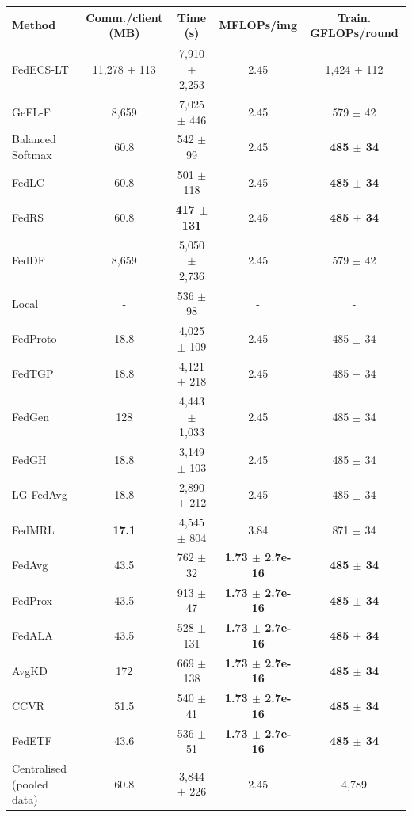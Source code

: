 \begin{tabular}{lcccc}
\toprule
Method & Comm./client (MB) & Time (s) & MFLOPs/img & Train. GFLOPs/round\\
\midrule
FedECS-LT & 11,278 $\pm$ 113 & 7,910 $\pm$ 2,253 & 2.45 & 1,424 $\pm$ 112\\
GeFL-F & 8,659 & 7,025 $\pm$ 446 & 2.45 & 579 $\pm$ 42\\
Balanced Softmax & 60.8 & 542 $\pm$ 99 & 2.45 & \textbf{485 $\pm$ 34}\\
FedLC & 60.8 & 501 $\pm$ 118 & 2.45 & \textbf{485 $\pm$ 34}\\
FedRS & 60.8 & \textbf{417 $\pm$ 131} & 2.45 & \textbf{485 $\pm$ 34}\\
FedDF & 8,659 & 5,050 $\pm$ 2,736 & 2.45 & 579 $\pm$ 42\\
Local & - & 536 $\pm$ 98 & - & -\\
FedProto & 18.8 & 4,025 $\pm$ 109 & 2.45 & 485 $\pm$ 34\\
FedTGP & 18.8 & 4,121 $\pm$ 218 & 2.45 & 485 $\pm$ 34\\
FedGen & 128 & 4,443 $\pm$ 1,033 & 2.45 & 485 $\pm$ 34\\
FedGH & 18.8 & 3,149 $\pm$ 103 & 2.45 & 485 $\pm$ 34\\
LG-FedAvg & 18.8 & 2,890 $\pm$ 212 & 2.45 & 485 $\pm$ 34\\
FedMRL & \textbf{17.1} & 4,545 $\pm$ 804 & 3.84 & 871 $\pm$ 34\\
FedAvg & 43.5 & 762 $\pm$ 32 & \textbf{1.73 $\pm$ 2.7e-16} & \textbf{485 $\pm$ 34}\\
FedProx & 43.5 & 913 $\pm$ 47 & \textbf{1.73 $\pm$ 2.7e-16} & \textbf{485 $\pm$ 34}\\
FedALA & 43.5 & 528 $\pm$ 131 & \textbf{1.73 $\pm$ 2.7e-16} & \textbf{485 $\pm$ 34}\\
AvgKD & 172 & 669 $\pm$ 138 & \textbf{1.73 $\pm$ 2.7e-16} & \textbf{485 $\pm$ 34}\\
CCVR & 51.5 & 540 $\pm$ 41 & \textbf{1.73 $\pm$ 2.7e-16} & \textbf{485 $\pm$ 34}\\
FedETF & 43.6 & 536 $\pm$ 51 & \textbf{1.73 $\pm$ 2.7e-16} & \textbf{485 $\pm$ 34}\\
Centralised (pooled data) & 60.8 & 3,844 $\pm$ 226 & 2.45 & 4,789\\
\bottomrule
\end{tabular}
